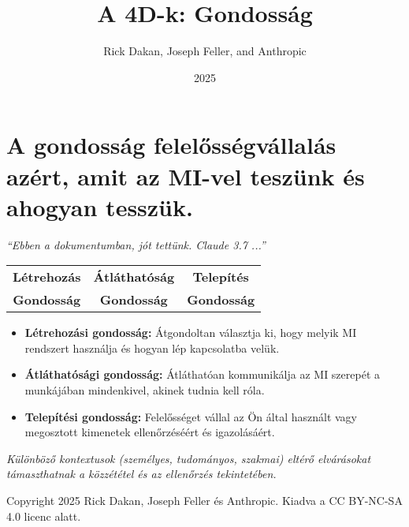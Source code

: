\documentclass[a4paper, 12pt]{article}
\begin{document}
\title{A 4D-k: Gondosság}
\author{Rick Dakan, Joseph Feller, and Anthropic}
\date{2025}
\maketitle

\section*{A gondosság felelősségvállalás azért, amit az MI-vel teszünk és ahogyan tesszük.}
\textit{“Ebben a dokumentumban, jót tettünk. Claude 3.7 ...”}

\begin{center}
\begin{tabular}{ccc}
\textbf{Létrehozás} & \textbf{Átláthatóság} & \textbf{Telepítés} \\
\textbf{Gondosság} & \textbf{Gondosság} & \textbf{Gondosság} \\
\end{tabular}
\end{center}

\begin{itemize}
    \item \textbf{Létrehozási gondosság:} Átgondoltan választja ki, hogy melyik MI rendszert használja és hogyan lép kapcsolatba velük.
    \item \textbf{Átláthatósági gondosság:} Átláthatóan kommunikálja az MI szerepét a munkájában mindenkivel, akinek tudnia kell róla.
    \item \textbf{Telepítési gondosság:} Felelősséget vállal az Ön által használt vagy megosztott kimenetek ellenőrzéséért és igazolásáért.
\end{itemize}

\textit{Különböző kontextusok (személyes, tudományos, szakmai) eltérő elvárásokat támaszthatnak a közzététel és az ellenőrzés tekintetében.}

\vspace{\fill}
\begin{center}
    \small{Copyright 2025 Rick Dakan, Joseph Feller és Anthropic. Kiadva a CC BY-NC-SA 4.0 licenc alatt.}
\end{center}
\end{document}
